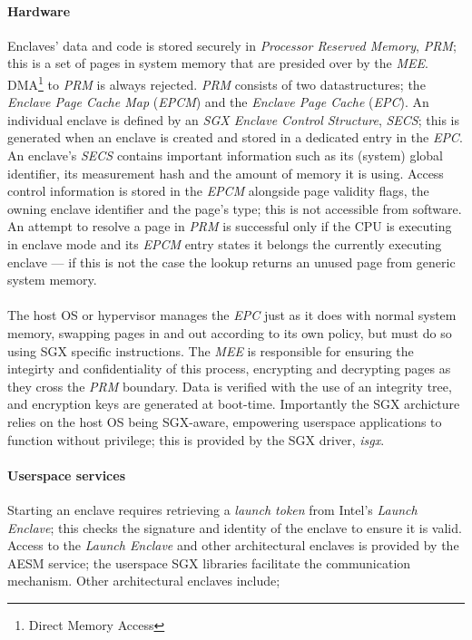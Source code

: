 \paragraph{Hardware} Enclaves' data and code is stored securely in \textit{Processor Reserved Memory}, \textit{PRM}; this is a set of pages in system memory that are presided over by the \textit{MEE}. DMA\footnote{Direct Memory Access} to \textit{PRM} is always rejected. \textit{PRM} consists of two datastructures; the \textit{Enclave Page Cache Map} (\textit{EPCM}) and the \textit{Enclave Page Cache} (\textit{EPC}). An individual enclave is defined by an \textit{SGX Enclave Control Structure}, \textit{SECS}; this is generated when an enclave is created and stored in a dedicated entry in the \textit{EPC}. An enclave's \textit{SECS} contains important information such as its (system) global identifier, its measurement hash and the amount of memory it is using. Access control information is stored in the \textit{EPCM} alongside page validity flags, the owning enclave identifier and the page's type; this is not accessible from software. An attempt to resolve a page in \textit{PRM} is successful only if the CPU is executing in enclave mode and its \textit{EPCM} entry states it belongs the currently executing enclave --- if this is not the case the lookup returns an unused page from generic system memory.

\paragraph{} The host OS or hypervisor manages the \textit{EPC} just as it does with normal system memory, swapping pages in and out according to its own policy, but must do so using SGX specific instructions. The \textit{MEE} is responsible for ensuring the integirty and confidentiality of this process, encrypting and decrypting pages as they cross the \textit{PRM} boundary. Data is verified with the use of an integrity tree, and encryption keys are generated at boot-time. Importantly the SGX archicture relies on the host OS being SGX-aware, empowering userspace applications to function without privilege; this is provided by the SGX driver, \textit{isgx}.

\paragraph{Userspace services} Starting an enclave requires retrieving a \textit{launch token} from Intel's \textit{Launch Enclave}; this checks the signature and identity of the enclave to ensure it is valid. Access to the \textit{Launch Enclave} and other architectural enclaves is provided by the AESM service; the userspace SGX libraries facilitate the communication mechanism. Other architectural enclaves include;

